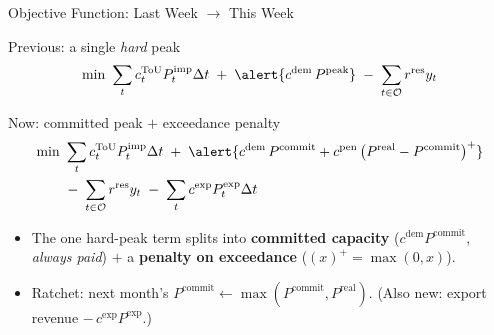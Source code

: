 \documentclass[aspectratio=169]{beamer}
\begin{document}
\begin{frame}{Objective Function: Last Week $\rightarrow$ This Week}
\begin{block}{Previous: a single \emph{hard} peak}
\small
\[
\min\ \sum_{t} c^{\text{ToU}}_t P^{\text{imp}}_t \Delta t
\;+\; \alert{c^{\text{dem}}\, P^{\text{peak}}}
\;-\; \sum_{t\in\mathcal{O}} r^{\text{res}} y_t
\]
\end{block}
\begin{block}{Now: committed peak $+$ exceedance penalty}
\small
\[
\begin{aligned}
\min\ &\sum_{t} c^{\text{ToU}}_t P^{\text{imp}}_t \Delta t
\;+\; \alert{c^{\text{dem}}\, P^{\text{commit}} + c^{\text{pen}}\,\bigl(P^{\text{real}} - P^{\text{commit}}\bigr)^{+}} \\
&-\; \sum_{t\in\mathcal{O}} r^{\text{res}} y_t
\;-\; \sum_{t} c^{\text{exp}} P^{\text{exp}}_t \Delta t
\end{aligned}
\]
\end{block}
\begin{itemize}\footnotesize
    \item The one hard-peak term splits into \textbf{committed capacity}
          ($c^{\text{dem}}P^{\text{commit}}$, \emph{always paid}) $+$ a
          \textbf{penalty on exceedance} \big($(x)^{+}=\max(0,x)$\big).
    \item Ratchet: next month's $P^{\text{commit}} \leftarrow \max(P^{\text{commit}}, P^{\text{real}})$.
          \quad (Also new: export revenue $-\,c^{\text{exp}}P^{\text{exp}}$.)
\end{itemize}
\end{frame}
\end{document}
